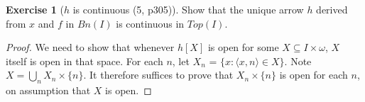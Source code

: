 \documentclass{article}
\theoremstyle{definition}
\newtheorem{ex}{Exercise}
\begin{document}
\begin{ex}[$h$ is continuous (5, p305)]

    Show that the unique arrow $h$ derived from $x$ and $f$ in $Bn(I)$ 
    is continuous in $Top(I)$.


\end{ex}
\begin{proof}
    We need to show that whenever $h[X]$ is open for some $X \subseteq I \times \omega$, 
    $X$ itself is open in that space. 
    For each $n$, let $X_n$ = $\{ x : \langle x, n \rangle \in X\}$. 
    Note $X = \bigcup_n X_n \times \{n\}$. It therefore suffices to prove that 
    $X_n \times \{n\}$ is open for each $n$, on assumption that $X$ is open.
\end{proof}
\end{document}
